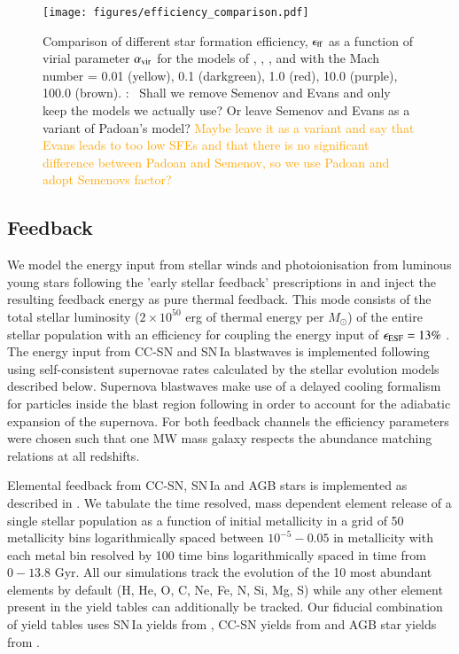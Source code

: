 \documentclass{aa}
\newcommand{\T}[1]{{\color{blue}{\bf T}:~ #1}}
\begin{document}
\begin{figure}
\begin{center}
    \texttt{[image: figures/efficiency\_comparison.pdf]}
    \caption{Comparison of different star formation efficiency, $\epsilon_{\rm ff}$ as a function of virial parameter $\alpha_{\rm vir}$ for the models of \citet[][blue]{Padoan_2012}, \citet[][pink]{Hopkins_2013}, \citet[][grey]{Evans_2022}, \citet[][lightgreen]{Semenov_2016} and \citet{Federrath2012} with the Mach number = 0.01 (yellow), 0.1 (darkgreen), 1.0 (red), 10.0 (purple), 100.0 (brown). \T{Shall we remove Semenov and Evans and only keep the models we actually use? Or leave Semenov and Evans as a variant of Padoan's model?} \textcolor{orange}{Maybe leave it as a variant and say that Evans leads to too low SFEs and that there is no significant difference between Padoan and Semenov, so we use Padoan and adopt Semenovs factor?}}
\end{center}
\end{figure}

\subsection{Feedback}
\label{sec:feedback}

We model the energy input from stellar winds and photoionisation from luminous young stars following the 'early stellar feedback' prescriptions in \citet{Stinson2013} and inject the resulting feedback energy as pure thermal feedback. This mode consists of the total stellar luminosity ($2 \times 10^{50}$ erg of thermal energy per $M_{\odot}$) of the entire stellar population with an efficiency for coupling the energy input of $\epsilon_{\rm ESF}=13\%$ \citep{Wang2015}. The energy input from CC-SN and SN\,Ia blastwaves is implemented following \citet{Stinson2006} using self-consistent supernovae rates calculated by the stellar evolution models described below. Supernova blastwaves make use of a delayed cooling formalism for particles inside the blast region following \citet{McKee1977} in order to account for the adiabatic expansion of the supernova.
For both feedback channels the efficiency parameters were chosen such that one MW mass galaxy respects the abundance matching relations \citep{Behroozi2013,Kravtsov2018,Moster2018} at all redshifts. 

Elemental feedback from CC-SN, SN\,Ia and AGB stars is implemented as described in \citet{Buck2021}. We tabulate the time resolved, mass dependent element release of a single stellar population as a function of initial metallicity in a grid of 50 metallicity bins logarithmically spaced between $10^{-5}-0.05$ in metallicity with each metal bin resolved by 100 time bins logarithmically spaced in time from $0-13.8$ Gyr. All our simulations track the evolution of the 10 most abundant elements by default (H, He, O, C, Ne, Fe, N, Si, Mg, S) while any other element present in the yield tables can additionally be tracked. Our fiducial combination of yield tables uses SN\,Ia yields from \citet{Seitenzahl2013}, CC-SN yields from \citet{Chieffi2004} and AGB star yields from \citet{Karakas2016}.
\end{document}
